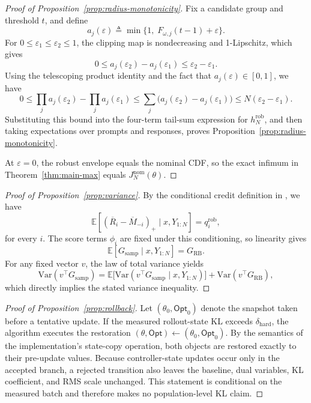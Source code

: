 \begin{proof}[Proof of Proposition~\ref{prop:radius-monotonicity}]
Fix a candidate group and threshold \(t\), and define
\[
a_j(\varepsilon) \triangleq \min\{1,\; F_{\omega,j}(t-1) + \varepsilon\}.
\]
For \(0 \le \varepsilon_1 \le \varepsilon_2 \le 1\), the clipping map is nondecreasing and 1-Lipschitz, which gives
\[
0 \le a_j(\varepsilon_2) - a_j(\varepsilon_1) \le \varepsilon_2 - \varepsilon_1.
\]
Using the telescoping product identity and the fact that \(a_j(\varepsilon) \in [0,1]\), we have
\[
0 \le \prod_j a_j(\varepsilon_2) - \prod_j a_j(\varepsilon_1)
\le \sum_j \bigl(a_j(\varepsilon_2) - a_j(\varepsilon_1)\bigr)
\le N(\varepsilon_2 - \varepsilon_1).
\]
Substituting this bound into the four-term tail-sum expression for \(h_N^{\mathrm{rob}}\), and then taking expectations over prompts and responses, proves Proposition~\ref{prop:radius-monotonicity}.

At \(\varepsilon = 0\), the robust envelope equals the nominal CDF, so the exact infimum in Theorem~\ref{thm:main-max} equals \(J_N^{\mathrm{nom}}(\theta)\).
\end{proof}

\begin{proof}[Proof of Proposition~\ref{prop:variance}]
By the conditional credit definition in , we have
\[
\mathbb E[(\overline R_i-\overline M_{-i})_+ \mid x, Y_{1:N}] = q_i^{\mathrm{rob}},
\]
for every \(i\). The score terms \(\phi_i\) are fixed under this conditioning, so linearity gives
\[
\mathbb E[G_{\mathrm{samp}} \mid x, Y_{1:N}] = G_{\mathrm{RB}}.
\]
For any fixed vector \(v\), the law of total variance yields
\[
\mathrm{Var}(v^\top G_{\mathrm{samp}})
=
\mathbb E\bigl[\mathrm{Var}(v^\top G_{\mathrm{samp}} \mid x, Y_{1:N})\bigr]
+
\mathrm{Var}(v^\top G_{\mathrm{RB}}),
\]
which directly implies the stated variance inequality.
\end{proof}

\begin{proof}[Proof of Proposition~\ref{prop:rollback}]
Let \((\theta_0, \mathsf{Opt}_0)\) denote the snapshot taken before a tentative update. If the measured rollout-state KL exceeds \(\delta_{\mathrm{hard}}\), the algorithm executes the restoration \((\theta, \mathsf{Opt}) \leftarrow (\theta_0, \mathsf{Opt}_0)\). By the semantics of the implementation's state-copy operation, both objects are restored exactly to their pre-update values. Because controller-state updates occur only in the accepted branch, a rejected transition also leaves the baseline, dual variables, KL coefficient, and RMS scale unchanged. This statement is conditional on the measured batch and therefore makes no population-level KL claim.
\end{proof}

